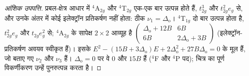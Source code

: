 \begin{proof}[आंशिक उपपत्ति]
प्रबल-क्षेत्र आधार में $^4$A$_{2g}$ और $^4$T$_{2g}$ एक-एक बार उत्पन्न होते हैं, $t_{2g}^3$ और $t_{2g}^2e_g$ से, और
उनके अंतर में कोई इलेक्ट्रॉन प्रतिकर्षण नहीं होता: ठीक $\nu_1 = \Delta_{\mathrm o}$। $^4$T$_{1g}$ दो बार
उत्पन्न होता है, $t_{2g}^2e_g$ और $t_{2g}e_g^2$ से; $^4$A$_{2g}$ के सापेक्ष $2\times2$ आव्यूह है
$\begin{pmatrix}\Delta_{\mathrm o} + 12B & 6B\\ 6B & 2\Delta_{\mathrm o} + 3B\end{pmatrix}$ (इलेक्ट्रॉन-प्रतिकर्षण अवयव स्वीकृत हैं)।
इसके  $E^2 - (15B + 3\Delta_{\mathrm o})E + 2\Delta_{\mathrm o}^2 + 27B\Delta_{\mathrm o} = 0$ के मूल हैं, जो बताए गए
$\nu_2$ और $\nu_3$ हैं। $\Delta_{\mathrm o} = 0$ पर वे 0 और $15B$ हैं ($^4$F और $^4$P पद); चित्र का पूर्ण
विकर्णीकरण उन्हें पुनरुत्पन्न करता है।
\end{proof}

